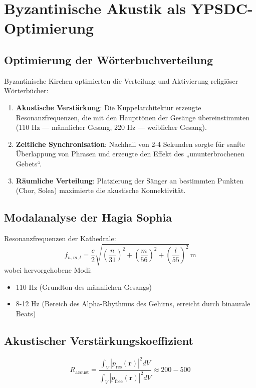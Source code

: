 \documentclass[12pt,a4paper]{article}
\begin{document}
	\section{Byzantinische Akustik als YPSDC-Optimierung}
	
	\subsection{Optimierung der Wörterbuchverteilung}
	
	Byzantinische Kirchen optimierten die Verteilung und Aktivierung religiöser Wörterbücher:
	
	\begin{enumerate}
		\item \textbf{Akustische Verstärkung}: Die Kuppelarchitektur erzeugte Resonanzfrequenzen, die mit den Haupttönen der Gesänge übereinstimmten (110 Hz — männlicher Gesang, 220 Hz — weiblicher Gesang).
		\item \textbf{Zeitliche Synchronisation}: Nachhall von 2-4 Sekunden sorgte für sanfte Überlappung von Phrasen und erzeugte den Effekt des „ununterbrochenen Gebets“.
		\item \textbf{Räumliche Verteilung}: Platzierung der Sänger an bestimmten Punkten (Chor, Solea) maximierte die akustische Konnektivität.
	\end{enumerate}
	
	\subsection{Modalanalyse der Hagia Sophia}
	
	Resonanzfrequenzen der Kathedrale:
	\[
	f_{n,m,l} = \frac{c}{2} \sqrt{\left(\frac{n}{31}\right)^2 + \left(\frac{m}{56}\right)^2 + \left(\frac{l}{55}\right)^2} \, \mathrm{m}
	\]
	wobei hervorgehobene Modi:
	\begin{itemize}
		\item 110 Hz (Grundton des männlichen Gesangs)
		\item 8-12 Hz (Bereich des Alpha-Rhythmus des Gehirns, erreicht durch binaurale Beats)
	\end{itemize}
	
	\subsection{Akustischer Verstärkungskoeffizient}
	\[
	R_{\mathrm{acoust}} = \frac{\int_V |p_{\mathrm{res}}(\mathbf{r})|^2 dV}{\int_V |p_{\mathrm{free}}(\mathbf{r})|^2 dV} \approx 200-500
	\]
	
\end{document}
